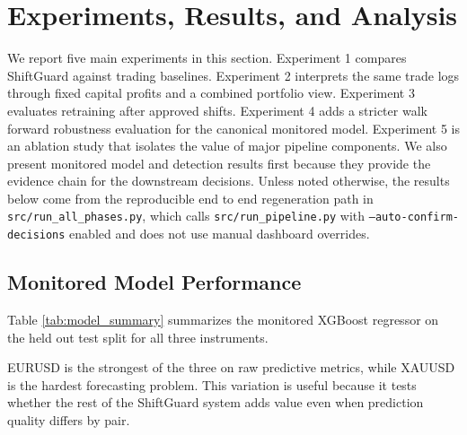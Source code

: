 \documentclass[11pt]{article}
\begin{document}
\section{Experiments, Results, and Analysis}
We report five main experiments in this section. Experiment 1 compares ShiftGuard against trading baselines. Experiment 2 interprets the same trade logs through fixed capital profits and a combined portfolio view. Experiment 3 evaluates retraining after approved shifts. Experiment 4 adds a stricter walk forward robustness evaluation for the canonical monitored model. Experiment 5 is an ablation study that isolates the value of major pipeline components. We also present monitored model and detection results first because they provide the evidence chain for the downstream decisions. Unless noted otherwise, the results below come from the reproducible end to end regeneration path in \texttt{src/run\_all\_phases.py}, which calls \texttt{src/run\_pipeline.py} with \texttt{--auto-confirm-decisions} enabled and does not use manual dashboard overrides.

\subsection{Monitored Model Performance}
Table \ref{tab:model_summary} summarizes the monitored XGBoost regressor on the held out test split for all three instruments.

\begin{table}[H]
\centering
\caption{Canonical monitored-model summary on the chronological test split.}
\label{tab:model_summary}
\end{table}

EURUSD is the strongest of the three on raw predictive metrics, while XAUUSD is the hardest forecasting problem. This variation is useful because it tests whether the rest of the ShiftGuard system adds value even when prediction quality differs by pair.
\end{document}
